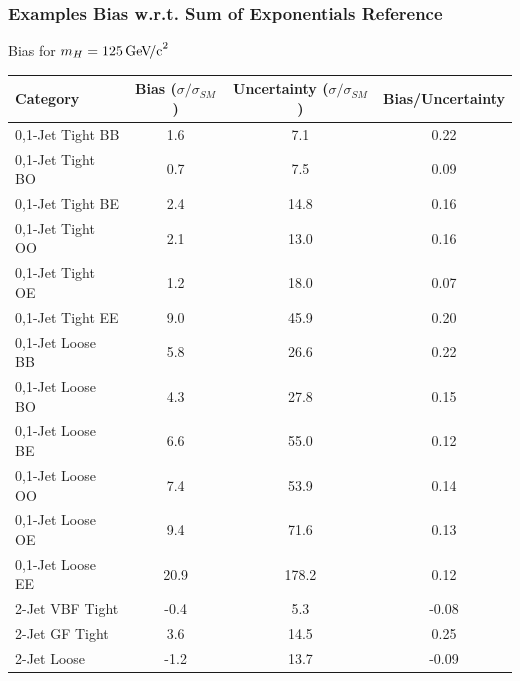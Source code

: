 \documentclass{beamer}
\newcommand{\GeVcc}{\ensuremath{\,\mathrm{Ge\kern -0.1em V\!/c}^2}}
\begin{document}
\begin{frame}
\frametitle{Examples Bias w.r.t. Sum of Exponentials Reference}
  \vspace{-1ex}
  \begin{center}
    Bias for $m_H=125\GeVcc{}$
    \\ \vspace{0.5ex}
    \scriptsize
    \begin{tabular}{|l|c|c|c|} \hline
Category                  & Bias ($\sigma/\sigma_{SM}$) & Uncertainty  ($\sigma/\sigma_{SM}$) & Bias/Uncertainty \\ \hline \hline
0,1-Jet Tight BB         &        1.6 &        7.1 &       0.22 \\ \hline
0,1-Jet Tight BO         &        0.7 &        7.5 &       0.09 \\ \hline
0,1-Jet Tight BE         &        2.4 &       14.8 &       0.16 \\ \hline
0,1-Jet Tight OO         &        2.1 &       13.0 &       0.16 \\ \hline
0,1-Jet Tight OE         &        1.2 &       18.0 &       0.07 \\ \hline
0,1-Jet Tight EE         &        9.0 &       45.9 &       0.20 \\ \hline
0,1-Jet Loose BB         &        5.8 &       26.6 &       0.22 \\ \hline
0,1-Jet Loose BO         &        4.3 &       27.8 &       0.15 \\ \hline
0,1-Jet Loose BE         &        6.6 &       55.0 &       0.12 \\ \hline
0,1-Jet Loose OO         &        7.4 &       53.9 &       0.14 \\ \hline
0,1-Jet Loose OE         &        9.4 &       71.6 &       0.13 \\ \hline
0,1-Jet Loose EE         &       20.9 &      178.2 &       0.12 \\ \hline
2-Jet VBF Tight          &       -0.4 &        5.3 &      -0.08 \\ \hline
2-Jet GF Tight           &        3.6 &       14.5 &       0.25 \\ \hline
2-Jet Loose              &       -1.2 &       13.7 &      -0.09 \\ \hline
    \end{tabular}
\\
  \small
  \end{center}
\end{frame}
\end{document}
